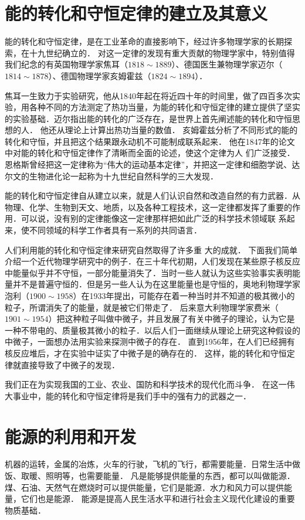\section{能的转化和守恒定律的建立及其意义}
能的转化和守恒定律，是在工业革命的直接影响下，经过许多物理学家的长期探索，在十九世纪确立的．
对这一定律的发现有重大贡献的物理学家中，特别值得我们纪念的有英国物理学家焦耳（$1818 \sim 1889$）、德国医生兼物理学家迈尔（$1814 \sim 1878$）、德国物理学家亥姆霍兹（$1824 \sim 1894$）．

焦耳一生致力于实验研究，他从1840年起在将近四十年的时间里，做了四百多次实验，用各种不同的方法测定了热功当量，为能的转化和守恒定律的建立提供了坚实的实验基础．迈尔指出能的转化的广泛存在，是世界上首先阐述能的转化和守恒思想的人．
他还从理论上计算出热功当量的数值．
亥姆霍兹分析了不同形式的能的转化和守恒，并且把这个结果跟永动机不可能制成联系起来．
他在1847年的论文中对能的转化和守恒定律作了清晰而全面的论述，使这个定律为人
们广泛接受．恩格斯曾经把这一定律称为“伟大的运动基本定律”，并把这一定律和细胞学说、达尔文的生物进化论一起称为十九世纪自然科学的三大发现．

能的转化和守恒定律自从建立以来，就是人们认识自然和改造自然的有力武器．从物理、化学、生物到天文、地质，以及各种工程技术，这一定律都发挥了重要的作用．可以说，没有别的定律能像这一定律那样把如此广泛的科学技术领域联
系起来，使不同领域的科学工作者具有一系列的共同语言．

人们利用能的转化和守恒定律来研究自然取得了许多重
大的成就．
下面我们简单介绍一个近代物理学研究中的例子．在三十年代初期，人们发现在某些原子核反应中能量似乎并不守恒，一部分能量消失了．当时一些人就认为这些实验事实表明能量并不是普遍守恒的．但是另一些人认为在这里能量也是守恒的，奥地利物理学家泡利（$1900 \sim 1958$）在1933年提出，可能存在着一种当时并不知道的极其微小的粒子，所谓消失了的能量，就是被它们带走了．
后来意大利物理学家费米（$1901 \sim 1954$）把这种粒子叫做中微子，并且发展了有关中微子的理论，认为它是一种不带电的、质量极其微小的粒子．以后人们一面继续从理论上研究这种假设的中微子，一面想办法用实验来探测中微子的存在．
直到1956年，在人们已经拥有核反应堆后，才在实验中证实了中微子是的确存在的．
这样，能的转化和守恒定律就直接导致了中微子的发现．

我们正在为实现我国的工业、农业、国防和科学技术的现代化而斗争．
在这一伟大事业中，能的转化和守恒定律将是我们手中的强有力的武器之一．

\section{能源的利用和开发}
机器的运转，金属的冶炼，火车的行驶，飞机的飞行，都需要能量．日常生活中做饭、取暖、照明等，也需要能量．
凡是能够提供能量的东西，都可以叫做能源．煤、石油、天然气在燃烧时可以提供能量，它们是能源．水力和风力可以提供能
量，它们也是能源．
能源是提高人民生活水平和进行社会主义现代化建设的重要物质基础．

